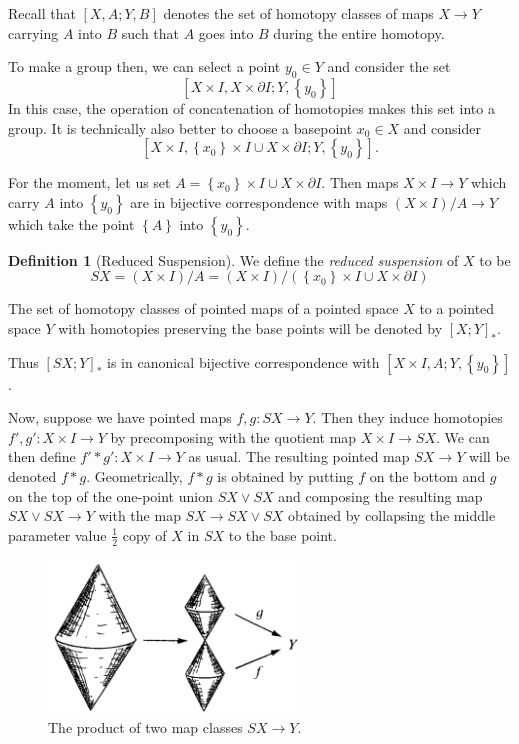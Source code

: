 \documentclass[reqno]{amsart}
\theoremstyle{definition}
\newtheorem{definition}[theorem]{Definition}
\theoremstyle{remark}
\begin{document}
Recall that $\left[ X,A ; Y ,B \right] $ denotes the
set of homotopy classes of maps $X \to Y$ carrying $A$ into
$B$ such that $A$ goes into $B$ during the entire homotopy.

To make a group then, we can select a point $y_0 \in Y$ and
consider the set
\[
\left[ X \times I, X \times \partial I ;
Y , \left\{ y_0 \right\} \right] 
\] 
In this case, the operation of concatenation of homotopies
makes this set into a group.
It is technically also better to choose a basepoint 
$x_0 \in X$ and consider
\[
\left[ X \times I, \left\{ x_0 \right\} \times I
\cup X \times \partial I ; Y , \left\{ y_0 \right\} \right] .
\] 

For the moment, let us set
$A = \left\{ x_0 \right\} \times I \cup 
X \times \partial I$. Then maps
$X \times I \to Y$ which carry $A$ into $\left\{ y_0 \right\} $ 
are in bijective correspondence with maps 
$\left( X \times I \right) / A \to Y$ which take
 the point $\left\{ A \right\} $ into 
 $\left\{ y_0 \right\} $. 
 
 \begin{definition}[Reduced Suspension]
     We define the \textit{reduced suspension} of
     $X$ to be
     \[
     SX = (X \times I) / A =
     \left( X \times I \right) /
     \left( \left\{ x_0 \right\} \times I
     \cup X \times \partial I \right) 
     \] 
 \end{definition}

 The set of homotopy classes of pointed maps
 of a pointed space $X$ to a pointed space $Y$ with
 homotopies preserving the base points will
 be denoted by $\left[ X;Y \right]_* $. 

 Thus
 $\left[ SX;Y \right]_* $ is in canonical bijective
 correspondence with
 $\left[ X \times I, A ; Y , \left\{ y_0 \right\}  \right] $.


 Now, suppose we have pointed maps
 $f,g \colon SX \to Y$. Then they
 induce homotopies
 $f',g' \colon X \times I \to Y$ by precomposing with the
 quotient map
  $X\times I \to SX$. We can then define
  $f' * g' \colon X \times I \to Y$ as usual.
  The resulting pointed map
  $SX \to Y$ will be denoted $f * g$.
  Geometrically, $f * g$ is obtained by
  putting $f$ on the bottom and $g$ on the top
  of the one-point union $SX \vee SX$ and composing
  the resulting map $SX \vee SX \to Y$ with the
  map $SX \to SX \vee SX$ obtained by collapsing the
  middle parameter value $\frac{1}{2}$ copy of
  $X$ in $SX$ to the base point.
  
  \begin{figure}[htpb]
      \centering
      \includegraphics[width=0.6\textwidth]{Figures/TKISO0932.png}
      \caption{The product of two map classes
      $SX \to Y$.}
      \label{fig:TKISO0932-png}
  \end{figure}
\end{document}
